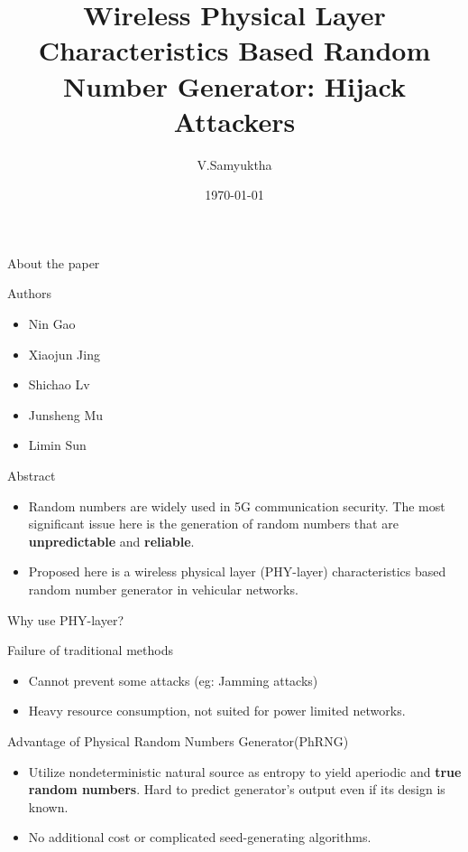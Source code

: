\documentclass{beamer}
\title{Wireless Physical Layer Characteristics Based
Random Number Generator: Hijack Attackers}
\author{V.Samyuktha}
\institute{IITH}
\date{\today}
\begin{document}
\begin{frame}
\titlepage
\end{frame}

\begin{frame}{About the paper}
\begin{block}{Authors}
    \begin{itemize}
        \item Nin Gao
        \item Xiaojun Jing
        \item Shichao Lv
        \item Junsheng Mu
        \item Limin Sun
    \end{itemize}
\end{block}
\begin{block}{Abstract}
    \begin{itemize}
        \item Random numbers are widely used in 5G communication security. The most significant issue here is the generation of random numbers that are \textbf{unpredictable} and \textbf{reliable}.
        \item Proposed here is a wireless physical layer (PHY-layer) characteristics based random number generator in vehicular networks.
    \end{itemize}
\end{block}
\end{frame}

\begin{frame}{Why use PHY-layer?}
\begin{block}{Failure of traditional methods}
    \begin{itemize}
        \item Cannot prevent some attacks (eg: Jamming attacks)
        \item Heavy resource consumption, not suited for power limited networks.
    \end{itemize}
\end{block}
\begin{block}{Advantage of Physical Random Numbers Generator(PhRNG)}
    \begin{itemize}
        \item Utilize nondeterministic natural source as entropy to yield aperiodic and \textbf{true random numbers}. Hard to predict generator's output even if its design is known.
        \item No additional cost or complicated seed-generating algorithms.
    \end{itemize}
\end{block}
\end{frame}
\end{document}
